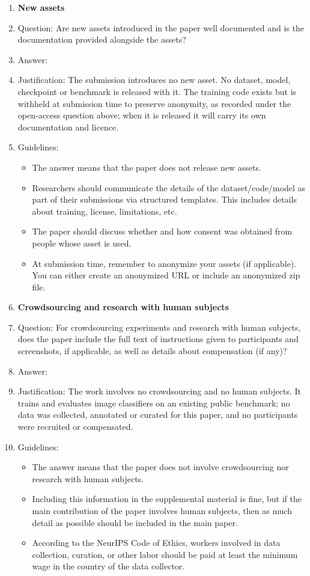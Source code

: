\begin{enumerate}
\item {\bf New assets}
    \item[] Question: Are new assets introduced in the paper well documented and is the documentation provided alongside the assets?
    \item[] Answer: \answerNA{}
    \item[] Justification: The submission introduces no new asset. No dataset, model, checkpoint or benchmark is released with it. The training code exists but is withheld at submission time to preserve anonymity, as recorded under the open-access question above; when it is released it will carry its own documentation and licence.
    \item[] Guidelines:
    \begin{itemize}
        \item The answer \answerNA{} means that the paper does not release new assets.
        \item Researchers should communicate the details of the dataset\slash code\slash model as part of their submissions via structured templates. This includes details about training, license, limitations, etc.
        \item The paper should discuss whether and how consent was obtained from people whose asset is used.
        \item At submission time, remember to anonymize your assets (if applicable). You can either create an anonymized URL or include an anonymized zip file.
    \end{itemize}

\item {\bf Crowdsourcing and research with human subjects}
    \item[] Question: For crowdsourcing experiments and research with human subjects, does the paper include the full text of instructions given to participants and screenshots, if applicable, as well as details about compensation (if any)?
    \item[] Answer: \answerNA{}
    \item[] Justification: The work involves no crowdsourcing and no human subjects. It trains and evaluates image classifiers on an existing public benchmark; no data was collected, annotated or curated for this paper, and no participants were recruited or compensated.
    \item[] Guidelines:
    \begin{itemize}
        \item The answer \answerNA{} means that the paper does not involve crowdsourcing nor research with human subjects.
        \item Including this information in the supplemental material is fine, but if the main contribution of the paper involves human subjects, then as much detail as possible should be included in the main paper.
        \item According to the NeurIPS Code of Ethics, workers involved in data collection, curation, or other labor should be paid at least the minimum wage in the country of the data collector.
    \end{itemize}


\end{enumerate}
